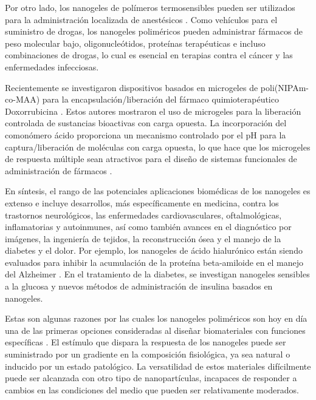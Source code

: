 Por otro lado, los nanogeles de pol\'imeros termosensibles pueden ser utilizados para la administraci\'on localizada de anest\'esicos \cite{srivastava2014thermoresponsive}. Como veh\'iculos para el suministro de drogas, los nanogeles polim\'ericos pueden administrar f\'armacos de peso molecular bajo, oligonucle\'otidos, prote\'inas terap\'euticas e incluso combinaciones de drogas, lo cual es esencial en terapias contra el c\'ancer y las enfermedades infecciosas.

Recientemente se investigaron dispositivos basados en microgeles de poli(NIPAm-co-MAA) para la encapsulaci\'on/liberaci\'on del f\'armaco quimioterap\'eutico Doxorrubicina \cite{Giussi2020, MartinezMoro2020, Pergushov2020}. Estos autores mostraron el uso de microgeles para la liberaci\'on controlada de sustancias bioactivas con carga opuesta.
La incorporaci\'on del comon\'omero \'acido proporciona un mecanismo controlado por el pH para la captura/liberaci\'on de mol\'eculas con carga opuesta, lo que hace que los microgeles de respuesta múltiple sean atractivos para el dise\~no de sistemas funcionales de administraci\'on de f\'armacos \cite{Liu2017}.

En s\'intesis, el rango de las potenciales aplicaciones biom\'edicas de los nanogeles es extenso e incluye desarrollos, m\'as espec\'ificamente en medicina, contra los trastornos neurol\'ogicos, las enfermedades cardiovasculares, oftalmol\'ogicas, inflamatorias y autoinmunes, as\'i como tambi\'en avances en el diagn\'ostico por im\'agenes, la ingenier\'ia de tejidos, la reconstrucci\'on \'osea y el manejo de la diabetes y el dolor. Por ejemplo, los nanogeles de \'acido hialur\'onico est\'an siendo evaluados para inhibir la acumulaci\'on de la prote\'ina beta-amiloide en el manejo del Alzheimer \cite{alonso2019nanogel}. En el tratamiento de la diabetes, se investigan nanogeles sensibles a la glucosa \cite{yang2019glucose} y nuevos m\'etodos de administraci\'on de insulina basados en nanogeles.

Estas son algunas razones por las cuales los nanogeles polim\'ericos son hoy en d\'ia una de las primeras opciones consideradas al dise\~nar biomateriales con funciones espec\'ificas \cite{soni2016nanogels,sabir2019polymeric}. El est\'imulo que dispara la respuesta de los nanogeles puede ser suministrado por un gradiente en la composici\'on fisiol\'ogica, ya sea natural o inducido por un estado patol\'ogico. La versatilidad de estos materiales dif\'icilmente puede ser alcanzada con otro tipo de nanopart\'iculas, incapaces de responder a cambios en las condiciones del medio que pueden ser relativamente moderados.

